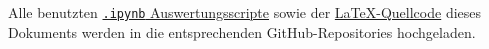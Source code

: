 \noindent
Alle benutzten \href{https://github.com/lrlunin/bachelorarbeit_python_notebooks_and_data/}{\color{blue}\texttt{.ipynb} Auswertungsscripte} sowie der \href{https://github.com/lrlunin/Bachelorarbeit/}{\color{blue}\LaTeX-Quellcode} dieses Dokuments werden in die entsprechenden GitHub-Repositories hochgeladen.   




